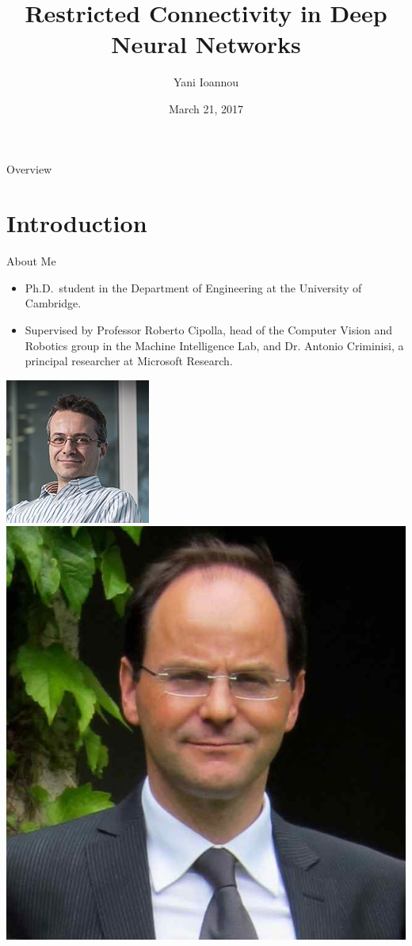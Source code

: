 \documentclass[t,xcolor=dvipsnames]{beamer}
\title[Restricted Connectivity in Deep Neural Networks] %
{Restricted Connectivity in Deep Neural Networks}
\author[Yani Ioannou]
{Yani Ioannou}
\institute[University of Cambridge] %
{University of Cambridge}
\date{March 21, 2017}
\begin{document}


\begin{frame}
  \titlepage
\end{frame}






\begin{frame}{Overview}
\tableofcontents
\end{frame}


\section{Introduction}

\begin{frame}{About Me}
\begin{itemize}
\item Ph.D.\ student in the Department of Engineering at the University of Cambridge.
\item Supervised by Professor Roberto Cipolla, head of the Computer Vision and Robotics group in the Machine Intelligence Lab, and Dr. Antonio Criminisi, a principal researcher at Microsoft Research.
\end{itemize}
\centering
\includegraphics[width=0.207\linewidth]{antonio}~
\includegraphics[width=0.2\linewidth]{roberto}
\end{frame}
\end{document}
